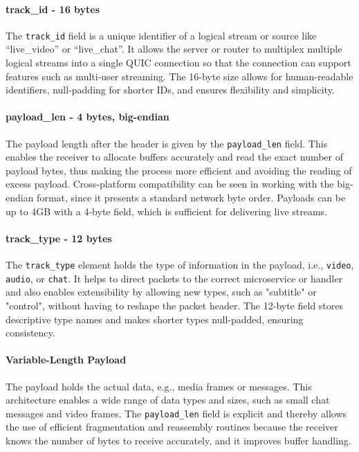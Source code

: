 \paragraph{track\_id - 16 bytes}
The \texttt{track\_id} field is a unique identifier of a logical stream or source like ``live\_video'' or ``live\_chat''. It allows the server or router to multiplex multiple logical streams into a single QUIC connection so that the connection can support features such as multi-user streaming. The 16-byte size allows for human-readable identifiers, null-padding for shorter IDs, and ensures flexibility and simplicity.

\paragraph{payload\_len - 4 bytes, big-endian}
The payload length after the header is given by the \texttt{payload\_len} field. This enables the receiver to allocate buffers accurately and read the exact number of payload bytes, thus making the process more efficient and avoiding the reading of excess payload. Cross-platform compatibility can be seen in working with the big-endian format, since it presents a standard network byte order. Payloads can be up to 4GB with a 4-byte field, which is sufficient for delivering live streams.

\paragraph{track\_type - 12 bytes}
The \texttt{track\_type} element holds the type of information in the payload, i.e., \texttt{video}, \texttt{audio}, or \texttt{chat}. It helps to direct packets to the correct microservice or handler and also enables extensibility by allowing new types, such as "subtitle" or "control", without having to reshape the packet header. The 12-byte field stores descriptive type names and makes shorter types null-padded, ensuring consistency.

\paragraph{Variable-Length Payload}
The payload holds the actual data, e.g., media frames or messages. This architecture enables a wide range of data types and sizes, such as small chat messages and video frames. The \texttt{payload\_len} field is explicit and thereby allows the use of efficient fragmentation and reassembly routines because the receiver knows the number of bytes to receive accurately, and it improves buffer handling.

